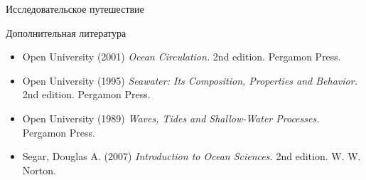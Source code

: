 \begin{chapter}{Исследовательское путешествие}
\begin{section}{Дополнительная литература}
\begin{itemize}
\item
Open University (2001) \textit{Ocean Circulation.} 2nd edition. Pergamon Press.
%

\item
Open University (1995) \textit{Seawater: Its Composition, Properties 
and Behavior.} 2nd edition. Pergamon Press.
%

\item
Open University (1989) \textit{Waves, Tides and Shallow-Water Processes.} 
Pergamon Press. 
%

\item
Segar, Douglas A. (2007) \textit{Introduction to Ocean Sciences.}
2nd edition. W. W. Norton.
%
\end{itemize}
\end{section}

\end{chapter}
